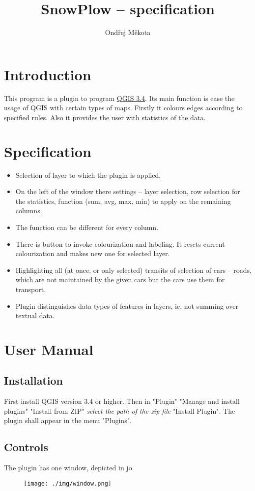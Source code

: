 \documentclass[12pt,a4paper]{article}
\begin{document}
\title{SnowPlow – specification}
\author{Ondřej Měkota}

\maketitle
\section{Introduction}

\par This program is a plugin to program \href{https://qgis.org/en/site/index.html}{QGIS 3.4}. 
Its main function is ease the usage of QGIS with certain types of maps.
Firstly it colours edges according to specified rules.
Also it provides the user with statistics of the data.


\section{Specification}
\begin{itemize}
    \item Selection of layer to which the plugin is applied.
    \item On the left of the window there settings – layer selection, row selection for the statistics, function (sum, avg, max, min) to apply on the remaining columns.
    \item The function can be different for every column.
    \item There is button to invoke colourization and labeling. It resets current colourization and makes new one for selected layer.
    \item Highlighting all (at once, or only selected) transits of selection of cars – roads, which are not maintained by the given cars but the cars use them for transport. 
    \item Plugin distinguishes data types of features in layers, ie. not summing over textual data. 
\end{itemize}

\section{User Manual}
\subsection{Installation}
First install QGIS version 3.4 or higher. 
Then in "Plugin" \rightarrow "Manage and install plugins" \rightarrow "Install from ZIP" \rightarrow \emph{select the path of the zip file} \rightarrow "Install Plugin".
The plugin shall appear in the menu "Plugins".

\subsection{Controls}
The plugin has one window, depicted in jo

\begin{figure}[H]\centering
\texttt{[image: ./img/window.png]}
\caption{}
\label{window}
\end{figure}
\end{document}

